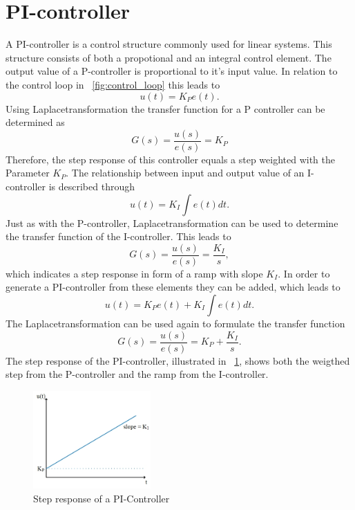 \section{PI-controller}
A PI-controller is a control structure commonly used for linear systems. This structure consists of both a propotional and an integral control element.
The output value of a P-controller is proportional to it's input value. In relation to the control loop in \figurename~\ref{fig:control_loop} this leads to
\begin{equation}
    u(t) = K_{P}e(t).
 \label{eq:p_contr_1}
\end{equation}
Using Laplacetransformation the transfer function for a P controller can be determined as
\begin{equation}
    G(s) = \frac{u(s)}{e(s)} = K_{P}
 \label{eq:p_contr_2}
\end{equation}
Therefore, the step response of this controller equals a step weighted with the Parameter $K_{P}$.
The relationship between input and output value of an I-controller is described through
\begin{equation}
    u(t) = K_{I}\int e(t) dt.
 \label{eq:i_contr_1}
\end{equation}
Just as with the P-controller, Laplacetransformation can be used to determine the transfer function of the I-controller.
This leads to
\begin{equation}
    G(s) = \frac{u(s)}{e(s)} = \frac{K_{I}}{s},
 \label{eq:i_contr_2}
\end{equation}
which indicates a step response in form of a ramp with slope $K_{I}$.
In order to generate a PI-controller from these elements they can be added, which leads to
\begin{equation}
    u(t) = K_{P}e(t) + K_{I}\int e(t) dt.
 \label{eq:pi_contr_1}
\end{equation}
The Laplacetransformation can be used again to formulate the transfer function
\begin{equation}
    G(s) = \frac{u(s)}{e(s)} =  K_{P} + \frac{K_{I}}{s}.
 \label{eq:pi_contr_2}
\end{equation}
The step response of the PI-controller, illustrated in \figurename~\ref{fig:step_resp_pi}, shows both the weigthed step from the P-controller and the ramp from the I-controller.

\begin{figure}[h]
   \centering
   \includegraphics[width=0.4\textwidth]{images/step_resp_pi.jpg}
   \caption[Step response of a PI-Controller]{Step response of a PI-Controller}
   \label{fig:step_resp_pi}
 \end{figure}

